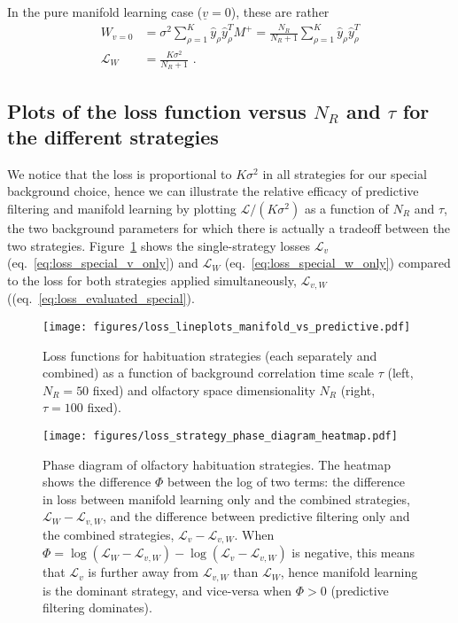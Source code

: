 \documentclass[letter, 12pt]{article}
\begin{document}
In the pure manifold learning case ($\underline{v} = 0$), these are rather
\begin{align}
	W_{v=0} &= \sigma^2 \sum_{\rho=1}^K \hat{y}_{\rho} \hat{y}_{\rho}^T M^+ =  \frac{N_R}{N_R + 1} \sum_{\rho=1}^K \hat{y}_{\rho} \hat{y}_{\rho}^T  \\
	\mathcal{L}_W &= \frac{K \sigma^2}{N_R + 1}
	\label{eq:loss_special_w_only} \,\, .
\end{align}


\subsection{Plots of the loss function versus $N_R$ and $\tau$ for the different strategies}
\label{subsec:plots}
We notice that the loss is proportional to $K \sigma^2$ in all strategies for our special background choice, hence we can illustrate the relative efficacy of predictive filtering and manifold learning by plotting $\mathcal{L} / (K\sigma^2)$ as a function of $N_R$ and $\tau$, the two background parameters for which there is actually a tradeoff between the two strategies. Figure~\ref{fig:loss} shows the single-strategy losses $\mathcal{L}_v$ (eq.~\ref{eq:loss_special_v_only}) and $\mathcal{L}_W$ (eq.~\ref{eq:loss_special_w_only})  compared to the loss for both strategies applied simultaneously, $\mathcal{L}_{v, W}$ ((eq.~\ref{eq:loss_evaluated_special}). 

\begin{figure}[htb]
	\centering
	\texttt{[image: figures/loss\_lineplots\_manifold\_vs\_predictive.pdf]}
	\caption{Loss functions for habituation strategies (each separately and combined) as a function of background correlation time scale $\tau$ (left, $N_R = 50$ fixed) and olfactory space dimensionality $N_R$ (right, $\tau = 100$ fixed). }
	\label{fig:loss}
\end{figure}
\begin{figure}[htb]
	\centering
	\texttt{[image: figures/loss\_strategy\_phase\_diagram\_heatmap.pdf]}
	\caption{Phase diagram of olfactory habituation strategies. The heatmap shows the difference $\Phi$ between the log of two terms: the difference in loss between manifold learning only and the combined strategies, $\mathcal{L}_W - \mathcal{L}_{v,W}$, and the difference between predictive filtering only and the combined strategies, $\mathcal{L}_v - \mathcal{L}_{v,W}$. When $\Phi = \log(\mathcal{L}_W - \mathcal{L}_{v,W}) - \log(\mathcal{L}_v - \mathcal{L}_{v,W})$ is negative, this means that $\mathcal{L}_v$ is further away from $\mathcal{L}_{v, W}$ than $\mathcal{L}_W$, hence manifold learning is the dominant strategy, and vice-versa when $\Phi > 0$ (predictive filtering dominates). }
	\label{fig:phase_diagram}
\end{figure}
\end{document}

